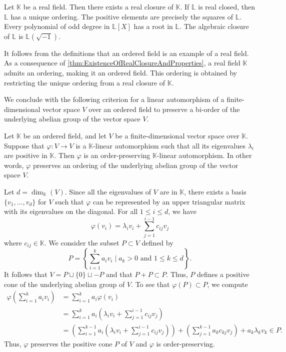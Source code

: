 \documentclass{amsart}
\makeatletter
\renewenvironment{proof}[1][\proofname]{%
   \par\pushQED{\qed}\normalfont%
   \topsep6\p@\@plus6\p@\relax
   \trivlist\item[\hskip\labelsep\bfseries#1\@addpunct{.}]%
   \ignorespaces
}{%
   \popQED\endtrivlist\@endpefalse
}
\makeatother
\begin{document}
\begin{thm}
    \label{thm:ExistenceOfRealClosureAndProperties}
    {\cite[\S 2, Theorem 2.2]{LangAlgebra}}
    Let $\mathbb{K}$ be a real field. Then there exists a real closure of $\mathbb{K}$. If $\mathbb{L}$ is real closed, then $\mathbb{L}$ has a unique ordering. The positive elements are precisely the squares of $\mathbb{L}$. Every polynomial of odd degree in $\mathbb{L}[X] $ has a root in $\mathbb{L}$. The algebraic closure of $\mathbb{L}$ is $\mathbb{L}(\sqrt{-1})$.
\end{thm}

It follows from the definitions that an ordered field is an example of a real field. As a consequence of \cref{thm:ExistenceOfRealClosureAndProperties}, a real field $\mathbb{K}$ admits an ordering, making it an ordered field.  This ordering is obtained by restricting the unique ordering from a real closure of $\mathbb{K}$. 

We conclude with the following criterion for a linear automorphism of a finite-dimensional vector space $V$ over an ordered field to preserve a bi-order of the underlying abelian group of the vector space $V$.

\begin{prop}
    \label{prop:PositiveEigenvaluesImpliesOP}
    Let $\mathbb{K}$ be an ordered field, and let $V$ be a finite-dimensional vector space over $\mathbb{K}$. Suppose that $\varphi: V \to V$ is a $\mathbb{K}$-linear automorphism such that all its eigenvalues $\lambda_i$ are positive in $\mathbb{K}$. Then $\varphi$ is an order-preserving $\mathbb{K}$-linear automorphism. In other words, $\varphi$ preserves an ordering of the underlying abelian group of the vector space $V$.    
\end{prop}

\begin{proof}
    Let $d = \dim_\mathbb{K}(V)$. Since all the eigenvalues of $V$ are in $\mathbb{K}$, there exists a basis $\{v_1,\dots,v_d\}$ for $V$ such that $\varphi$ can be represented by an upper triangular matrix with its eigenvalues on the diagonal. For all $1\leq i \leq d$, we have
    \[
    \varphi(v_i) = \lambda_i v_i + \sum_{j=1}^{i-1}c_{ij}v_j 
    \]
    where $c_{ij} \in \mathbb{K}$. We consider the subset $P \subset V$ defined by
    \[
    P = \left\{ \sum\limits_{i=1}^k a_i v_i \mid a_k > 0 \text{ and }1 \leq k \leq d\right\}.
    \]
    It follows that $V = P \sqcup \{0\} \sqcup -P $ and that $P+P\subset P$. Thus, $P$ defines a positive cone of the underlying abelian group of $V$. To see that $\varphi(P) \subset P$, we compute
    \begin{align*}
        \varphi\left(\sum\limits_{i=1}^k a_i v_i \right) 
    &= \sum\limits_{i=1}^k a_i \varphi(v_i) \\
    &= \sum\limits_{i=1}^k a_i (\lambda_i v_i + \sum_{j=1}^{i-1}c_{ij}v_j ) \\
    &= \left(\sum\limits_{i=1}^{k-1} a_i (\lambda_i v_i + \sum_{j=1}^{i-1}c_{ij}v_j )\right) + \left(\sum_{j=1}^{k-1}a_kc_{kj}v_j\right) + a_k\lambda_k v_k \in P.
    \end{align*}
    Thus, $\varphi$ preserves the positive cone $P$ of $V$ and $\varphi$ is order-preserving. 
\end{proof}
\end{document}
